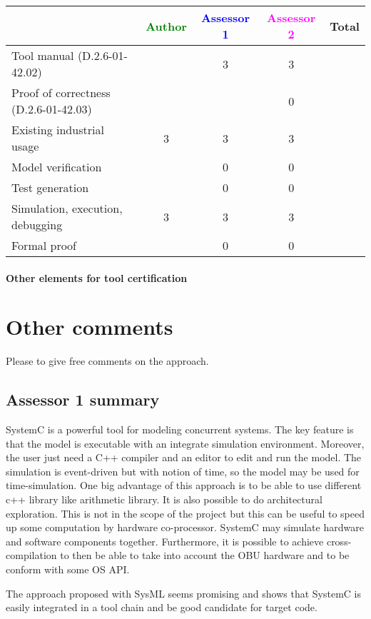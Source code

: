 \begin{tabular}{|l | c | c | c | c|}
\hline
& \textcolor{green}{Author} & \textcolor{blue}{Assessor 1} & \textcolor{magenta}{Assessor 2} & Total \\
\hline
Tool manual (D.2.6-01-42.02) & &3 &3 & \\
\hline
Proof of correctness (D.2.6-01-42.03) & & &0 & \\
\hline
Existing industrial usage &3 &3 &3 & \\
\hline
Model verification & &0 &0 & \\
\hline
Test generation & &0 &0 & \\
\hline
Simulation, execution, debugging &3 &3 &3 & \\
\hline
Formal proof & &0 &0 & \\
\hline
\end{tabular}

\paragraph{Other elements for tool certification}

\section{Other comments}
Please to give free comments on the approach.

\subsection{Assessor 1 summary}
SystemC is a powerful tool for modeling concurrent systems. The key
feature is that the model is executable with  an integrate simulation
environment. Moreover, the user just need a C++ compiler and an editor
to edit and run the model. 
The simulation is event-driven but with notion of time, so the model
may be used for time-simulation.
One big advantage of this approach is to be able to use different c++
library like arithmetic library. It is also possible to do
architectural exploration. This is not in the scope of the project but
this can be useful to speed up some computation by hardware
co-processor. SystemC may simulate hardware and software components together.
Furthermore, it is possible to achieve cross-compilation to then be able
to take into account the OBU hardware and to be conform with some OS
API.

The approach proposed with SysML seems promising and shows that
SystemC is easily integrated in a tool chain and be good candidate for
target code.

